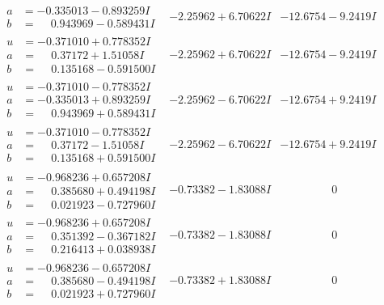 \documentclass[1p]{elsarticle_modified}
\theoremstyle{definition}
\begin{document}
$$\begin{array}{c|c|c}
\begin{aligned}
a &= -0.335013 - 0.893259 I \\
b &= \phantom{-}0.943969 - 0.589431 I\end{aligned}
 & -2.25962 + 6.70622 I & -12.6754 - 9.2419 I \\ \hline\begin{aligned}
u &= -0.371010 + 0.778352 I \\
a &= \phantom{-}0.37172 + 1.51058 I \\
b &= \phantom{-}0.135168 - 0.591500 I\end{aligned}
 & -2.25962 + 6.70622 I & -12.6754 - 9.2419 I \\ \hline\begin{aligned}
u &= -0.371010 - 0.778352 I \\
a &= -0.335013 + 0.893259 I \\
b &= \phantom{-}0.943969 + 0.589431 I\end{aligned}
 & -2.25962 - 6.70622 I & -12.6754 + 9.2419 I \\ \hline\begin{aligned}
u &= -0.371010 - 0.778352 I \\
a &= \phantom{-}0.37172 - 1.51058 I \\
b &= \phantom{-}0.135168 + 0.591500 I\end{aligned}
 & -2.25962 - 6.70622 I & -12.6754 + 9.2419 I \\ \hline\begin{aligned}
u &= -0.968236 + 0.657208 I \\
a &= \phantom{-}0.385680 + 0.494198 I \\
b &= \phantom{-}0.021923 - 0.727960 I\end{aligned}
 & -0.73382 - 1.83088 I & \phantom{-0.000000 } 0 \\ \hline\begin{aligned}
u &= -0.968236 + 0.657208 I \\
a &= \phantom{-}0.351392 - 0.367182 I \\
b &= \phantom{-}0.216413 + 0.038938 I\end{aligned}
 & -0.73382 - 1.83088 I & \phantom{-0.000000 } 0 \\ \hline\begin{aligned}
u &= -0.968236 - 0.657208 I \\
a &= \phantom{-}0.385680 - 0.494198 I \\
b &= \phantom{-}0.021923 + 0.727960 I\end{aligned}
 & -0.73382 + 1.83088 I & \phantom{-0.000000 } 0 \\ \hline\begin{aligned}

\end{aligned}
\end{array}$$
\end{document}
